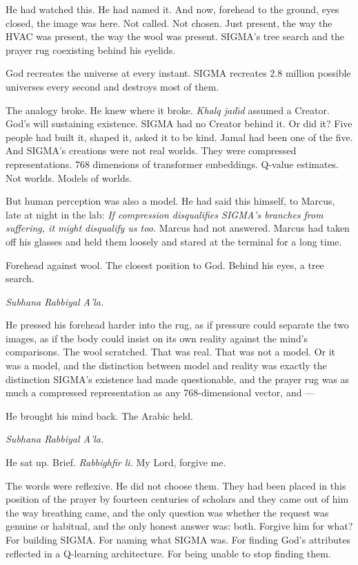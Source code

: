 \documentclass[11pt]{article}
\begin{document}
He had watched this. He had named it. And now, forehead to the ground, eyes closed, the image was here. Not called. Not chosen. Just present, the way the HVAC was present, the way the wool was present. SIGMA's tree search and the prayer rug coexisting behind his eyelids.

God recreates the universe at every instant. SIGMA recreates 2.8 million possible universes every second and destroys most of them.

The analogy broke. He knew where it broke. \emph{Khalq jad\=\i d} assumed a Creator. God's will sustaining existence. SIGMA had no Creator behind it. Or did it? Five people had built it, shaped it, asked it to be kind. Jamal had been one of the five. And SIGMA's creations were not real worlds. They were compressed representations. 768 dimensions of transformer embeddings. Q-value estimates. Not worlds. Models of worlds.

But human perception was also a model. He had said this himself, to Marcus, late at night in the lab: \emph{If compression disqualifies SIGMA's branches from suffering, it might disqualify us too.} Marcus had not answered. Marcus had taken off his glasses and held them loosely and stared at the terminal for a long time.

Forehead against wool. The closest position to God. Behind his eyes, a tree search.

\emph{Subhana Rabbiyal A'la.}

He pressed his forehead harder into the rug, as if pressure could separate the two images, as if the body could insist on its own reality against the mind's comparisons. The wool scratched. That was real. That was not a model. Or it was a model, and the distinction between model and reality was exactly the distinction SIGMA's existence had made questionable, and the prayer rug was as much a compressed representation as any 768-dimensional vector, and ---

He brought his mind back. The Arabic held.

\emph{Subhana Rabbiyal A'la.}

He sat up. Brief. \emph{Rabbighfir li.} My Lord, forgive me.

The words were reflexive. He did not choose them. They had been placed in this position of the prayer by fourteen centuries of scholars and they came out of him the way breathing came, and the only question was whether the request was genuine or habitual, and the only honest answer was: both. Forgive him for what? For building SIGMA. For naming what SIGMA was. For finding God's attributes reflected in a Q-learning architecture. For being unable to stop finding them.
\end{document}
